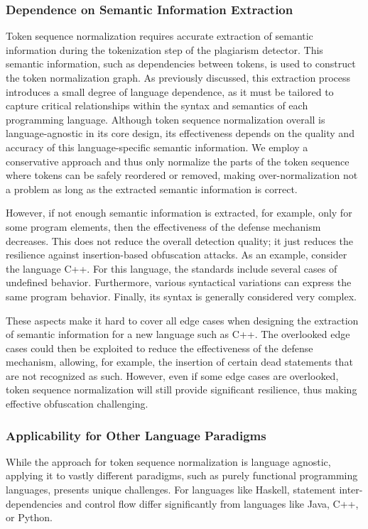 \subsubsection{Dependence on Semantic Information Extraction}
Token sequence normalization requires accurate extraction of semantic information during the tokenization step of the plagiarism detector. This semantic information, such as dependencies between tokens, is used to construct the token normalization graph. As previously discussed, this extraction process introduces a small degree of language dependence, as it must be tailored to capture critical relationships within the syntax and semantics of each programming language.
%
Although token sequence normalization overall is language-agnostic in its core design, its effectiveness depends on the quality and accuracy of this language-specific semantic information. We employ a conservative approach and thus only normalize the parts of the token sequence where tokens can be safely reordered or removed, making over-normalization not a problem as long as the extracted semantic information is correct.

However, if not enough semantic information is extracted, for example, only for some program elements, then the effectiveness of the defense mechanism decreases. This does not reduce the overall detection quality; it just reduces the resilience against insertion-based obfuscation attacks. As an example, consider the language C++. For this language, the standards include several cases of undefined behavior. Furthermore, various syntactical variations can express the same program behavior. Finally, its syntax is generally considered very complex.

These aspects make it hard to cover all edge cases when designing the extraction of semantic information for a new language such as C++. The overlooked edge cases could then be exploited to reduce the effectiveness of the defense mechanism, allowing, for example, the insertion of certain dead statements that are not recognized as such.
%
However, even if some edge cases are overlooked, token sequence normalization will still provide significant resilience, thus making effective obfuscation challenging.

\subsubsection{Applicability for Other Language Paradigms}
While the approach for token sequence normalization is language agnostic, applying it to vastly different paradigms, such as purely functional programming languages, presents unique challenges. For languages like Haskell, statement inter-dependencies and control flow differ significantly from languages like Java, C++, or Python.

